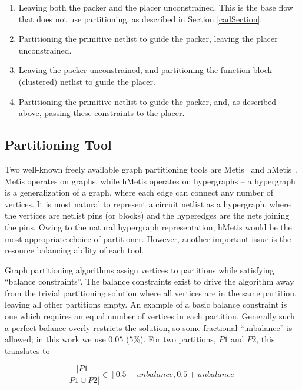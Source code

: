\begin{enumerate}[label=(\roman*)]
  \item Leaving both the packer and the placer unconstrained. This is the base flow that does not use partitioning, as described in Section \ref{cadSection}.
  \item Partitioning the primitive netlist to guide the packer, leaving the placer unconstrained.
  \item Leaving the packer unconstrained, and partitioning the function block (clustered) netlist to guide the placer.
  \item Partitioning the primitive netlist to guide the packer, and, as described above, passing these constraints to the placer.
\end{enumerate}

\subsection{Partitioning Tool}
Two well-known freely available graph partitioning tools are Metis~\cite{karypis1998multilevelmetis} and hMetis~\cite{karypis1999multilevelhmetis}. Metis operates on graphs, while hMetis operates on hypergraphs -- a hypergraph is a generalization of a graph, where each edge can connect any number of vertices. It is most natural to represent a circuit netlist as a hypergraph, where the vertices are netlist pins (or blocks) and the hyperedges are the nets joining the pins. Owing to the natural hypergraph representation, hMetis would be the most appropriate choice of partitioner. However, another important issue is the resource balancing ability of each tool.

Graph partitioning algorithms assign vertices to partitions while satisfying ``balance constraints''. The balance constraints exist to drive the algorithm away from the trivial partitioning solution where all vertices are in the same partition, leaving all other partitions empty. An example of a basic balance constraint is one which requires an equal number of vertices in each partition. Generally such a perfect balance overly restricts the solution, so some fractional ``unbalance'' is allowed; in this work we use $0.05$ ($5\%$). For two partitions, $P1$ and $P2$, this translates to~\cite{karypismanual}

\begin{equation}\label{eq:balance_constraint}
\frac{|P1|}{|P1 \cup P2|} \in [0.5 - unbalance, 0.5 + unbalance]
\end{equation}

